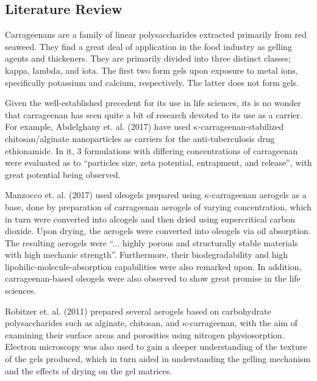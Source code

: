 \documentclass[a4paper,12pt]{article}
\begin{document}
\subsection{Literature Review}

Carrageenans are a family of linear polysaccharides extracted primarily from red seaweed. They find a great deal of application in the food industry as gelling agents and thickeners. They are primarily divided into three distinct classes; kappa, lambda, and iota.\supercite{stanley_chapter_nodate} The first two form gels upon exposure to metal ions, specifically potassium and calcium, respectively. The latter does not form gels.\supercite{garcia-gonzalez_polysaccharide-based_2011}

Given the well-established precedent for its use in life sciences, its is no wonder that carrageenan has seen quite a bit of research devoted to its use as a carrier. For example, Abdelghany et. al. (2017) have used $\kappa$-carrageenan-stabilized chitosan/alginate nanoparticles as carriers for the anti-tuberculosis drug ethionamide. In it, 3 formulations with differing concentrations of carrageenan were evaluated as to “particles size, zeta potential, entrapment, and release”, with great potential being observed.\supercite{abdelghany_carrageenan-stabilized_2017}

Manzocco et. al. (2017) used oleogels prepared using $\kappa$-carrageenan aerogels as a base, done by preparation of carrageenan aerogels of varying concentration, which in turn were converted into alcogels and then dried using supercritical carbon dioxide. Upon drying, the aerogels were converted into oleogels via oil absorption. The resulting aerogels were “... highly porous and structurally stable materials with high mechanic strength”. Furthermore, their biodegradability and high lipohilic-molecule-absorption capabilities were also remarked upon. In addition, carrageenan-based oleogels were also observed to show great promise in the life sciences.\supercite{manzocco_exploitation_2017}

Robitzer et. al. (2011) prepared several aerogels based on carbohydrate polysaccharides such as alginate, chitosan, and $\kappa$-carrageenan, with the aim of examining their surface areas and porosities using nitrogen physiosorption. Electron microscopy was also used to gain a deeper understanding of the texture of the gels produced, which in turn aided in understanding the gelling mechanism and the effects of drying on the gel matrices.\supercite{robitzer_nitrogen_2011}
\end{document}
